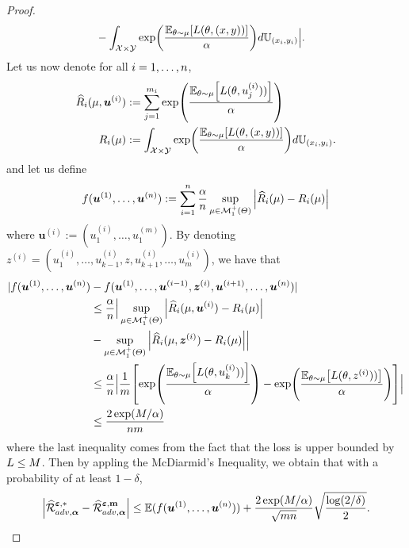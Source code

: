 \begin{proof}
\begin{align*}
    &- \int_{\mathcal{X}\times\mathcal{Y}}\exp\left(\frac{\mathbb{E}_{\theta \sim \mu}\left[\loss(\theta,(x,y))\right]}{\alpha}\right) d\mathbb{U}_{(x_i,y_i)} \Big|.
\end{align*}
Let us now denote for all $i=1,\dots,n$,
\begin{align*}
    \widehat{R}_i(\mu,\bm{u}^{(i)})&:=\sum_{j=1}^{m_i}\exp\left(\frac{\mathbb{E}_{\theta \sim \mu}\left[\loss(\theta,u_j^{(i)}))\right]}{\alpha}\right)\\
    R_i(\mu)&:= \int_{\mathcal{X}\times\mathcal{Y}}\exp\left(\frac{\mathbb{E}_{\theta \sim \mu}\left[\loss(\theta,(x,y))\right]}{\alpha}\right) d\mathbb{U}_{(x_i,y_i)}.
\end{align*}
and let us define 
\begin{align*}
    f(\bm{u}^{(1)},\dots,\bm{u}^{(n)}):=\sum_{i=1}^n\frac{\alpha}{n}\sup_{\mu\in \mathcal{M}^+_1(\Theta)}\Big |\widehat{R}_i(\mu) -R_i(\mu)\Big |
\end{align*}
where $\bm{u}^{(i)}:=(u_1^{(i)},\dots,u_1^{(m)})$. By denoting $z^{(i)}=(u_1^{(i)},\dots,u_{k-1}^{(i)},z,u_{k+1}^{(i)},\dots,u_m^{(i)})$, we have that
\begin{align*}
  |f(\bm{u}^{(1)},\dots,\bm{u}^{(\numsamples)})& - f(\bm{u}^{(1)},\dots,\bm{u}^{(i-1)},\bm{z}^{(i)},\bm{u}^{(i+1)},\dots,\bm{u}^{(\numsamples)})|\\
  &\leq \frac{\alpha}{\numsamples}\Big | \sup_{\mu\in \mathcal{M}^+_1(\Theta)}\Big |\widehat{R}_i(\mu,\bm{u}^{(i)}) -R_i(\mu)\Big |\\
 & - \sup_{\mu\in \mathcal{M}^+_1(\Theta)}\Big |\widehat{R}_i(\mu,\bm{z}^{(i)}) -R_i(\mu)\Big | \Big |\\
  &\leq \frac{\alpha}{\numsamples}\Big |\frac{1}{m}\left[\exp\left(\frac{\mathbb{E}_{\theta \sim \mu}\left[\loss(\theta,u_k^{(i)}))\right]}{\alpha}\right) - \exp\left(\frac{\mathbb{E}_{\theta \sim \mu}\left[\loss(\theta,z^{(i)}))\right]}{\alpha}\right) \right]\Big| \\
  &\leq \frac{2\exp(M/\alpha)}{\numsamples m}
\end{align*}
where the last inequality comes from the fact that the loss is upper bounded by $L\leq M$. Then by appling the McDiarmid’s Inequality, we obtain that with a probability of at least $1-\delta$,
\begin{align*}
 \Big| \widehat{\mathcal{R}}^{\bm{\varepsilon},*}_{adv,\bm{\alpha}} - \widehat{\mathcal{R}}^{\bm{\varepsilon},\textbf{m}}_{adv,\bm{\alpha}}\Big |\leq\mathbb{E}(f(\bm{u}^{(1)},\dots,\bm{u}^{(\numsamples)}))+\frac{2\exp(M/\alpha)}{\sqrt{m\numsamples}}\sqrt{\frac{\log(2/\delta)}{2}}.

\end{align*}
\end{proof}
